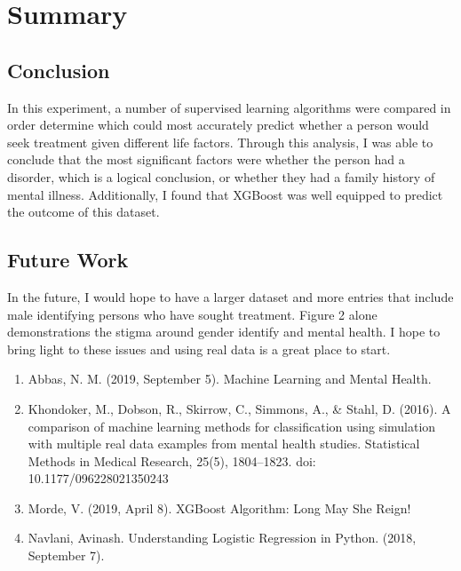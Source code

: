 \documentclass{article}
\begin{document}
\section{Summary}
\subsection{Conclusion} 
In this experiment, a number of supervised learning algorithms were compared in order determine which could most accurately predict whether a person would seek treatment given different life factors. Through this analysis, I was able to conclude that the most significant factors were whether the person had a disorder, which is a logical conclusion, or whether they had a family history of mental illness. Additionally, I found that XGBoost was well equipped to predict the outcome of this dataset.
\subsection{Future Work} 
In the future, I would hope to have a larger dataset and more entries that include male identifying persons who have sought treatment. Figure 2 alone demonstrations the stigma around gender identify and mental health. I hope to bring light to these issues and using real data is a great place to start.



\begin{enumerate}
	\item Abbas, N. M. (2019, September 5). Machine Learning and Mental Health. 
	\item Khondoker, M., Dobson, R., Skirrow, C., Simmons, A., & Stahl, D. (2016). A comparison of machine learning methods for classification using simulation with multiple real data examples from mental health studies. Statistical Methods in Medical Research, 25(5), 1804–1823. doi: 10.1177/096228021350243
	\item Morde, V. (2019, April 8). XGBoost Algorithm: Long May She Reign!
	\item Navlani, Avinash. Understanding Logistic Regression in Python. (2018, September 7). 
\end{enumerate}
\end{document}
